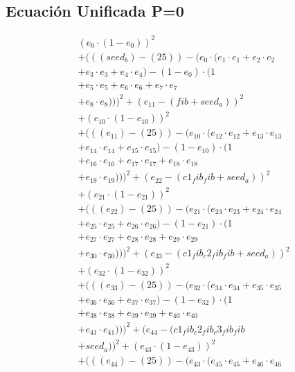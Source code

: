 \documentclass[10pt, a4paper]{article}
\begin{document}
\subsection*{Ecuación Unificada P=0}
\begin{align*}
& (e_{0} \cdot (1 - e_{0}))^{2} \\
& + (((seed_b) - (25)) - (e_{0} \cdot (e_{1} \cdot e_{1} + e_{2} \cdot e_{2} \\
& + e_{3} \cdot e_{3} + e_{4} \cdot e_{4}) - (1 - e_{0}) \cdot (1 \\
& + e_{5} \cdot e_{5} + e_{6} \cdot e_{6} + e_{7} \cdot e_{7} \\
& + e_{8} \cdot e_{8})))^{2} + (e_{11} - (fib + seed_a))^{2} \\
& + (e_{10} \cdot (1 - e_{10}))^{2} \\
& + (((e_{11}) - (25)) - (e_{10} \cdot (e_{12} \cdot e_{12} + e_{13} \cdot e_{13} \\
& + e_{14} \cdot e_{14} + e_{15} \cdot e_{15}) - (1 - e_{10}) \cdot (1 \\
& + e_{16} \cdot e_{16} + e_{17} \cdot e_{17} + e_{18} \cdot e_{18} \\
& + e_{19} \cdot e_{19})))^{2} + (e_{22} - (c1_fib_fib + seed_a))^{2} \\
& + (e_{21} \cdot (1 - e_{21}))^{2} \\
& + (((e_{22}) - (25)) - (e_{21} \cdot (e_{23} \cdot e_{23} + e_{24} \cdot e_{24} \\
& + e_{25} \cdot e_{25} + e_{26} \cdot e_{26}) - (1 - e_{21}) \cdot (1 \\
& + e_{27} \cdot e_{27} + e_{28} \cdot e_{28} + e_{29} \cdot e_{29} \\
& + e_{30} \cdot e_{30})))^{2} + (e_{33} - (c1_fib_c2_fib_fib + seed_a))^{2} \\
& + (e_{32} \cdot (1 - e_{32}))^{2} \\
& + (((e_{33}) - (25)) - (e_{32} \cdot (e_{34} \cdot e_{34} + e_{35} \cdot e_{35} \\
& + e_{36} \cdot e_{36} + e_{37} \cdot e_{37}) - (1 - e_{32}) \cdot (1 \\
& + e_{38} \cdot e_{38} + e_{39} \cdot e_{39} + e_{40} \cdot e_{40} \\
& + e_{41} \cdot e_{41})))^{2} + (e_{44} - (c1_fib_c2_fib_c3_fib_fib \\
& + seed_a))^{2} + (e_{43} \cdot (1 - e_{43}))^{2} \\
& + (((e_{44}) - (25)) - (e_{43} \cdot (e_{45} \cdot e_{45} + e_{46} \cdot e_{46} \\

\end{align*}
\end{document}
